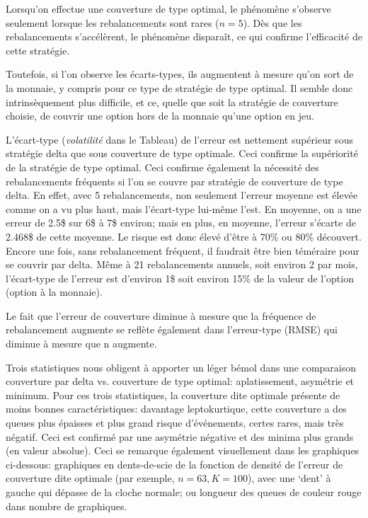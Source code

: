 \documentclass[12pt,fleqn]{article}
\begin{document}
Lorsqu’on effectue une couverture de type optimal, le phénomène s’observe seulement
lorsque les rebalancements sont rares ($n = 5$). Dès que les rebalancements s’accélèrent,
le phénomène disparaît, ce qui confirme l’efficacité de cette stratégie.

Toutefois, si l’on observe les écarts-types, ils augmentent à mesure qu’on sort de la
monnaie, y compris pour ce type de stratégie de type optimal. Il semble donc
intrinsèquement plus difficile, et ce, quelle que soit la stratégie de couverture choisie,
de couvrir une option hors de la monnaie qu’une option en jeu.

L’écart-type (\textit{volatilité} dans le Tableau) de l’erreur est nettement supérieur
sous stratégie delta que sous couverture de type optimale. Ceci confirme la supériorité de
la stratégie de type optimal. Ceci confirme également la nécessité des rebalancements
fréquents si l’on se couvre par stratégie de couverture de type delta. En effet, avec 5
rebalancements, non seulement l’erreur moyenne est élevée comme on a vu plus haut, mais
l’écart-type lui-même l’est. En moyenne, on a une erreur de 2.5\$ sur 6\$ à 7\$ environ;
mais en plus, en moyenne, l’erreur s’écarte de 2.468\$ de cette moyenne. Le risque est
donc élevé d’être à 70\% ou 80\% découvert. Encore une fois, sans rebalancement fréquent, il
faudrait être bien téméraire pour se couvrir par delta. Même à 21 rebalancements annuels,
soit environ 2 par mois, l’écart-type de l’erreur est d’environ 1\$ soit environ 15\% de la
valeur de l’option (option à la monnaie).

Le fait que l’erreur de couverture diminue à mesure que la fréquence de rebalancement
augmente se reflète également dans l’erreur-type (RMSE) qui diminue à mesure que n
augmente.

Trois statistiques nous obligent à apporter un léger bémol dans une comparaison couverture
par delta vs. couverture de type optimal: aplatissement, asymétrie et minimum. Pour ces
trois statistiques, la couverture dite optimale présente de moins bonnes
caractéristiques: davantage leptokurtique, cette couverture a des queues plus épaisses et
plus grand risque d’événements, certes rares, mais très négatif. Ceci est confirmé par une
asymétrie négative et des minima plus grands (en valeur absolue). Ceci se remarque
également visuellement dans les graphiques ci-dessous: graphiques en dents-de-scie de la
fonction de densité de l’erreur de couverture dite optimale (par exemple, $n = 63, K =100$),
avec une `dent' à gauche qui dépasse de la cloche normale; ou longueur des queues de
couleur rouge dans nombre de graphiques. 
\end{document}
